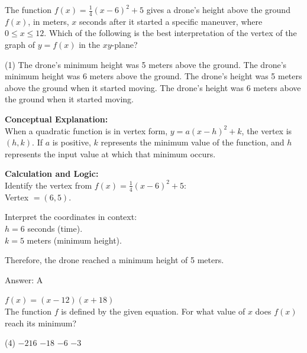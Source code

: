 \documentclass[11pt,paper=a4,answers]{exam}
\begin{document}
\begin{questions}
\vspace{40pt}

\question
The function $f(x) = \frac{1}{4}(x-6)^2 + 5$ gives a drone's height above the ground $f(x)$, in meters, $x$ seconds after it started a specific maneuver, where $0 \leq x \leq 12$. Which of the following is the best interpretation of the vertex of the graph of $y = f(x)$ in the $xy$-plane?
\begin{tasks}(1)
    \task The drone's minimum height was 5 meters above the ground.
    \task The drone's minimum height was 6 meters above the ground.
    \task The drone's height was 5 meters above the ground when it started moving.
    \task The drone's height was 6 meters above the ground when it started moving.
\end{tasks}

\begin{solution}
\textbf{Conceptual Explanation:} \\
When a quadratic function is in vertex form, $y = a(x-h)^2 + k$, the vertex is $(h, k)$. If $a$ is positive, $k$ represents the minimum value of the function, and $h$ represents the input value at which that minimum occurs.

\vspace{20pt}

\textbf{Calculation and Logic:} \\
Identify the vertex from $f(x) = \frac{1}{4}(x-6)^2 + 5$: \\
Vertex $= (6, 5)$.

\vspace{10pt}

Interpret the coordinates in context: \\
$h = 6$ seconds (time). \\
$k = 5$ meters (minimum height).

\vspace{10pt}

Therefore, the drone reached a minimum height of 5 meters.

\vspace{25pt}

Answer: \colorbox{yellow!100}{A}
\end{solution}

\vspace{40pt}

\question
$f(x) = (x-12)(x+18)$ \\
The function $f$ is defined by the given equation. For what value of $x$ does $f(x)$ reach its minimum?
\begin{tasks}(4)
    \task $-216$
    \task $-18$
    \task $-6$
    \task $-3$
\end{tasks}


\end{questions}
\end{document}
